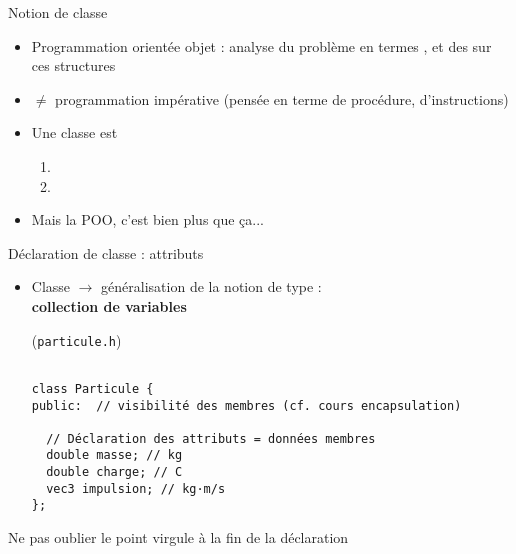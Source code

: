 \documentclass[c]{beamer}
\begin{document}
\begin{frame}[fragile]{Notion de classe}

\begin{itemize}[<+->]
\item Programmation orientée objet : analyse du problème en termes , et des  sur ces structures

\item \(\neq\) programmation impérative (pensée en terme de procédure, d'instructions)

\item Une classe est

\begin{enumerate}
\item {}

\item {}
\end{enumerate}

\item Mais la POO, c'est bien plus que ça...
\end{itemize}

\end{frame}


\begin{frame}[fragile]{Déclaration de classe : attributs}

\begin{itemize}
\item Classe \(\rightarrow\) généralisation de la notion de type :\\ \textbf{collection de variables}
\begin{cbox}[][lwuc](\texttt{particule.h})
\begin{verbatim}

class Particule {
public:  // visibilité des membres (cf. cours encapsulation)

  // Déclaration des attributs = données membres
  double masse; // kg
  double charge; // C
  vec3 impulsion; // kg·m/s
};
\end{verbatim}
\end{cbox}
\end{itemize}

\pause

\begin{cbox}[][][\centering]
 Ne pas oublier le point virgule à la fin de la déclaration
\end{cbox}

\end{frame}
\end{document}
